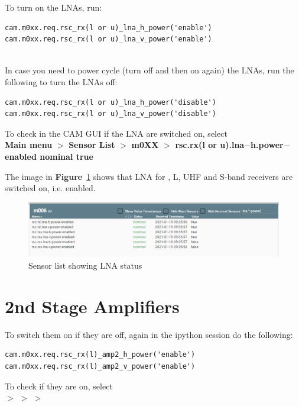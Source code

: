 To turn on the LNAs, run:
\begin{lstlisting}[style=DOS]
cam.m0xx.req.rsc_rx(l or u)_lna_h_power('enable') 
cam.m0xx.req.rsc_rx(l or u)_lna_v_power('enable') 


\end{lstlisting}


In case you need to power cycle (turn off and then on again) the LNAs, run the following to turn the LNAs off:
\begin{lstlisting}[style=DOS]
cam.m0xx.req.rsc_rx(l or u)_lna_h_power('disable') 
cam.m0xx.req.rsc_rx(l or u)_lna_v_power('disable') 
\end{lstlisting}




To check in the CAM GUI if the LNA are switched on, select\\
 \textbf{Main menu} $>$ \textbf{ Sensor List}  $>$ \textbf{m0XX} $>$ \textbf{rsc.rx(l or u).lna$-$h.power$-$enabled nominal true}


The image in \textbf{Figure}~\ref{fig:image41} shows that LNA for , L, UHF and S-band receivers are switched on, i.e. enabled. 

\begin{figure}[!thb]
	\centering

	\includegraphics[scale=0.4]{Chapters/images/image41.png}
	
	\caption{Sensor list showing LNA status}
	\label{fig:image41}
\end{figure} 
\section{ 2nd Stage Amplifiers}

To switch them on if they are off, again in the ipython session do the following:

\begin{lstlisting}[style=DOS]
cam.m0xx.req.rsc_rx(l)_amp2_h_power('enable')
cam.m0xx.req.rsc_rx(l)_amp2_v_power('enable')
\end{lstlisting}

To check if they are on, select\\
 $>$   $>$  $>$ 


